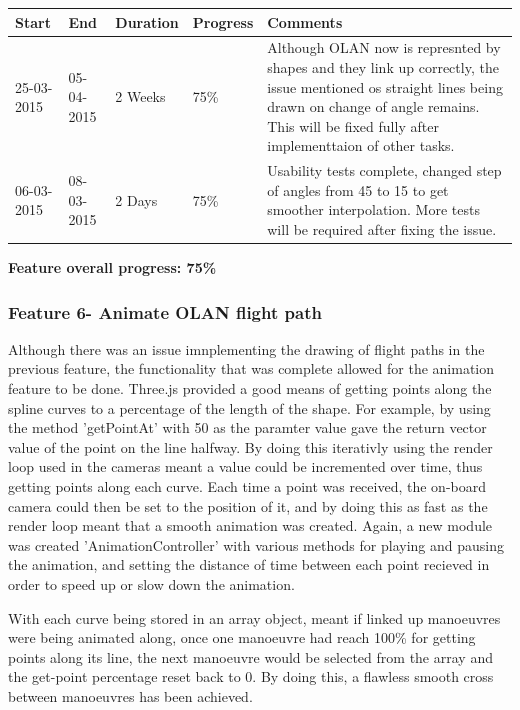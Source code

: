 \begin{table}[h]
\begin{tabular}{|l|l|l|l|p{7cm}|}
\hline
\textbf{Start} & \textbf{End} & \textbf{Duration} & \textbf{Progress} & \textbf{Comments}                                                                                                     \\ \hline
25-03-2015     & 05-04-2015   & 2 Weeks            & 75\%             &  Although OLAN now is represnted by shapes and they link up correctly, the issue mentioned os straight lines being drawn on change of angle remains. This will be fixed fully after implementtaion of other tasks.\\ \hline
06-03-2015     & 08-03-2015   & 2 Days            & 75\%             &  Usability tests complete, changed step of angles from 45 to 15 to get smoother interpolation. More tests will be required after fixing the issue.\\ \hline
\end{tabular}
\end{table}

\textbf{Feature overall progress: 75\%}

\subsubsection{Feature 6- Animate OLAN flight path}
Although there was an issue imnplementing the drawing of flight paths in the previous feature, the functionality that was complete allowed for the animation feature to be done. Three.js provided a good means of getting points along the spline curves to a percentage of the length of the shape. For example, by using the method 'getPointAt' with 50 as the paramter value gave the return vector value of the point on the line halfway. By doing this iterativly using the render loop used in the cameras meant a value could be incremented over time, thus getting points along each curve. Each time a point was received, the on-board camera could then be set to the position of it, and by doing this as fast as the render loop meant that a smooth animation was created. Again, a new module was created 'AnimationController' with various methods for playing and pausing the animation, and setting the distance of time between each point recieved in order to speed up or slow down the animation.

With each curve being stored in an array object, meant if linked up manoeuvres were being animated along, once one manoeuvre had reach 100\% for getting points along its line, the next manoeuvre would be selected from the array and the get-point percentage reset back to 0. By doing this, a flawless smooth cross between manoeuvres has been achieved.

